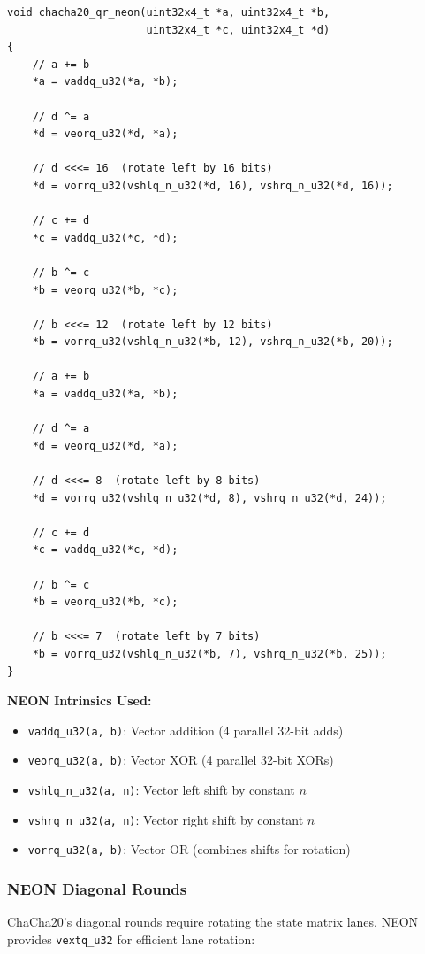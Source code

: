 \documentclass[11pt,a4paper]{article}
\begin{document}
\begin{lstlisting}[caption={NEON Quarter Round Implementation}]
void chacha20_qr_neon(uint32x4_t *a, uint32x4_t *b, 
                      uint32x4_t *c, uint32x4_t *d)
{
    // a += b
    *a = vaddq_u32(*a, *b);
    
    // d ^= a
    *d = veorq_u32(*d, *a);
    
    // d <<<= 16  (rotate left by 16 bits)
    *d = vorrq_u32(vshlq_n_u32(*d, 16), vshrq_n_u32(*d, 16));
    
    // c += d
    *c = vaddq_u32(*c, *d);
    
    // b ^= c
    *b = veorq_u32(*b, *c);
    
    // b <<<= 12  (rotate left by 12 bits)
    *b = vorrq_u32(vshlq_n_u32(*b, 12), vshrq_n_u32(*b, 20));
    
    // a += b
    *a = vaddq_u32(*a, *b);
    
    // d ^= a
    *d = veorq_u32(*d, *a);
    
    // d <<<= 8  (rotate left by 8 bits)
    *d = vorrq_u32(vshlq_n_u32(*d, 8), vshrq_n_u32(*d, 24));
    
    // c += d
    *c = vaddq_u32(*c, *d);
    
    // b ^= c
    *b = veorq_u32(*b, *c);
    
    // b <<<= 7  (rotate left by 7 bits)
    *b = vorrq_u32(vshlq_n_u32(*b, 7), vshrq_n_u32(*b, 25));
}
\end{lstlisting}

\textbf{NEON Intrinsics Used:}
\begin{itemize}[noitemsep]
    \item \texttt{vaddq\_u32(a, b)}: Vector addition (4 parallel 32-bit adds)
    \item \texttt{veorq\_u32(a, b)}: Vector XOR (4 parallel 32-bit XORs)
    \item \texttt{vshlq\_n\_u32(a, n)}: Vector left shift by constant $n$
    \item \texttt{vshrq\_n\_u32(a, n)}: Vector right shift by constant $n$
    \item \texttt{vorrq\_u32(a, b)}: Vector OR (combines shifts for rotation)
\end{itemize}

\subsubsection{NEON Diagonal Rounds}

ChaCha20's diagonal rounds require rotating the state matrix lanes. NEON provides \texttt{vextq\_u32} for efficient lane rotation:
\end{document}
